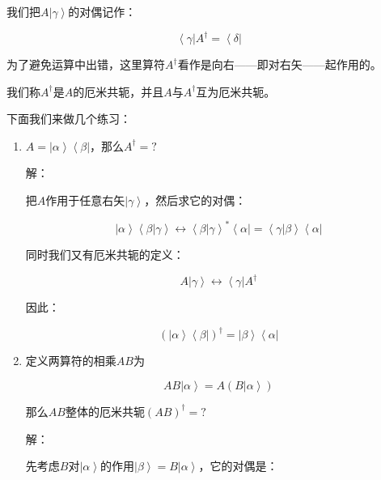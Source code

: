 我们把$A \left| \gamma \right\rangle$的对偶记作：

\begin{equation}
\left\langle \gamma \right| A^\dagger = \left\langle \delta \right|~
\end{equation}

为了避免运算中出错，这里算符$A^\dagger$看作是向右——即对右矢——起作用的。

我们称$A^\dagger $是$A$的厄米共轭，并且$A$与$A^\dagger $互为厄米共轭。

下面我们来做几个练习：

\begin{enumerate}
\item 

$A = \left| \alpha \right\rangle \left\langle \beta \right|$，那么$A^\dagger = ?$

解：

把$A$作用于任意右矢$\left| \gamma \right\rangle$，然后求它的对偶：

\begin{equation}
\left| \alpha \right\rangle \left\langle \beta | \gamma \right\rangle \leftrightarrow \left\langle \beta | \gamma \right\rangle^* \left\langle \alpha \right| = \left\langle \gamma | \beta \right\rangle \left\langle \alpha \right|~
\end{equation}

同时我们又有厄米共轭的定义：

\begin{equation}
A \left| \gamma \right\rangle \leftrightarrow \left\langle \gamma \right|   A^\dagger~
\end{equation}

因此：

\begin{equation}
\left(  \left| \alpha \right\rangle \left\langle \beta \right|  \right)^\dagger = \left| \beta \right\rangle \left\langle \alpha \right|~
\end{equation}


\item

定义两算符的相乘$AB $为

\begin{equation}
AB \left| \alpha \right\rangle = A \left( B \left| \alpha \right\rangle  \right)~
\end{equation}

那么$AB$整体的厄米共轭$(AB)^\dagger = ?$

解：

先考虑$B$对$\left| \alpha \right\rangle$的作用$\left| \beta \right\rangle =  B \left| \alpha \right\rangle$，它的对偶是：


\end{enumerate}
